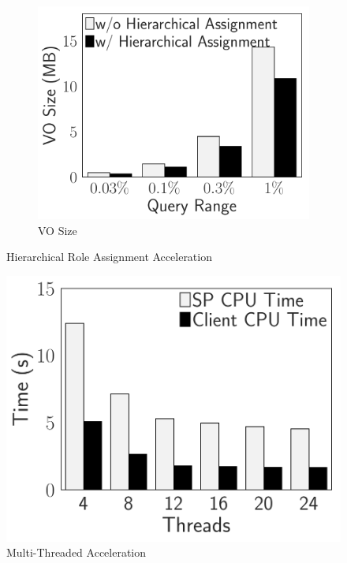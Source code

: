 \begin{figure}[t]
\begin{subfigure}{.33\linewidth}
        \includegraphics[width=\linewidth]{exp-figs/access-control/hierarchical_vo.pdf}
        \caption{VO Size}
    \end{subfigure}
    \caption{Hierarchical Role Assignment Acceleration}\label{exp-fig:access-control:hierarchical}
\end{figure}
\begin{figure}[t]
    \centering
    \includegraphics[width=0.33\linewidth]{exp-figs/access-control/thread.pdf}
    \caption{Multi-Threaded Acceleration}\label{exp-fig:access-control:thread}
\end{figure}
